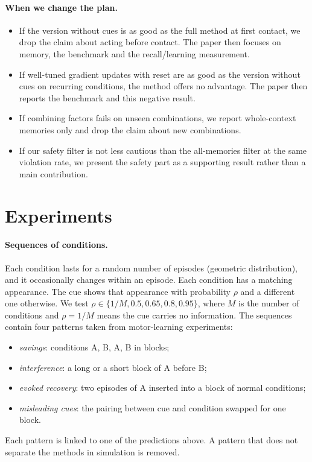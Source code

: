 \documentclass[10pt]{article}
\begin{document}
\paragraph{When we change the plan.}
\begin{itemize}
  \item If the version without cues is as good as the full method at first contact, we drop the claim
  about acting before contact. The paper then focuses on memory, the benchmark and the recall/learning
  measurement.
  \item If well-tuned gradient updates with reset are as good as the version without cues on recurring
  conditions, the method offers no advantage. The paper then reports the benchmark and this negative
  result.
  \item If combining factors fails on unseen combinations, we report whole-context memories only and
  drop the claim about new combinations.
  \item If our safety filter is not less cautious than the all-memories filter at the same violation
  rate, we present the safety part as a supporting result rather than a main contribution.
\end{itemize}

\section{Experiments}

\paragraph{Sequences of conditions.}
Each condition lasts for a random number of episodes (geometric distribution), and it occasionally
changes within an episode. Each condition has a matching appearance. The cue shows that appearance
with probability $\rho$ and a different one otherwise. We test $\rho\in\{1/M,0.5,0.65,0.8,0.95\}$,
where $M$ is the number of conditions and $\rho=1/M$ means the cue carries no information. The
sequences contain four patterns taken from motor-learning experiments:
\begin{itemize}
  \item \emph{savings}: conditions A, B, A, B in blocks;
  \item \emph{interference}: a long or a short block of A before B;
  \item \emph{evoked recovery}: two episodes of A inserted into a block of normal conditions;
  \item \emph{misleading cues}: the pairing between cue and condition swapped for one block.
\end{itemize}
Each pattern is linked to one of the predictions above. A pattern that does not separate the methods
in simulation is removed.
\end{document}
